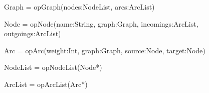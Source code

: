 \begin{gomcode}[caption=Signature algébrique correspondant au métamodèle de la
  figure~\ref{fig:graphmm}.,label=code:signalgGraph]
Graph = opGraph(nodes:NodeList, arcs:ArcList)

Node  = opNode(name:String, graph:Graph, incomings:ArcList, outgoings:ArcList)

Arc   = opArc(weight:Int, graph:Graph, source:Node, target:Node)

NodeList = opNodeList(Node*)

ArcList   = opArcList(Arc*)
\end{gomcode}

